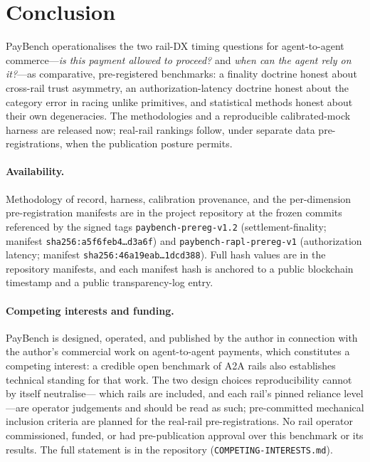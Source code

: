 \documentclass[11pt]{article}
\begin{document}
\section{Conclusion}
PayBench operationalises the two rail-DX timing questions for agent-to-agent commerce---\emph{is this
payment allowed to proceed?} and \emph{when can the agent rely on it?}---as comparative, pre-registered
benchmarks: a finality doctrine honest about cross-rail trust asymmetry, an authorization-latency
doctrine honest about the category error in racing unlike primitives, and statistical methods honest
about their own degeneracies. The methodologies and a reproducible calibrated-mock harness are released
now; real-rail rankings follow, under separate data pre-registrations, when the publication posture
permits.

\paragraph{Availability.} Methodology of record, harness, calibration provenance, and the per-dimension
pre-registration manifests are in the project repository at the frozen commits referenced by the signed
tags \texttt{paybench-prereg-v1.2} (settlement-finality; manifest \texttt{sha256:a5f6feb4\ldots d3a6f})
and \texttt{paybench-rapl-prereg-v1} (authorization latency; manifest
\texttt{sha256:46a19eab\ldots1dcd388}). Full hash values are in the repository manifests, and each
manifest hash is anchored to a public blockchain timestamp and a public transparency-log entry.

\paragraph{Competing interests and funding.} PayBench is designed, operated, and published by the author
in connection with the author's commercial work on agent-to-agent payments, which constitutes a competing
interest: a credible open benchmark of A2A rails also establishes technical standing for that work. The
two design choices reproducibility cannot by itself neutralise---
which rails are included, and each rail's pinned reliance level---are operator judgements and should be
read as such; pre-committed mechanical inclusion criteria are planned for the real-rail pre-registrations.
No rail operator commissioned, funded, or had pre-publication approval over this benchmark or its results.
The full statement is in the repository (\texttt{COMPETING-INTERESTS.md}).
\end{document}
